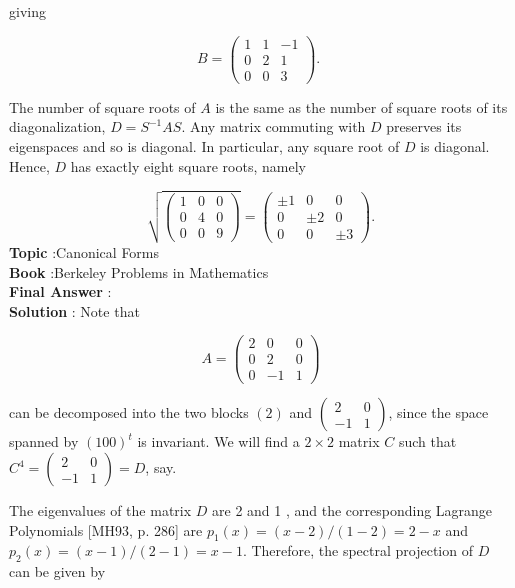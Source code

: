 \documentclass[10pt]{article}
\begin{document}
giving

$$
B=\left(\begin{array}{ccc}
1 & 1 & -1 \\
0 & 2 & 1 \\
0 & 0 & 3
\end{array}\right) \text {. }
$$

The number of square roots of $A$ is the same as the number of square roots of its diagonalization, $D=S^{-1} A S$. Any matrix commuting with $D$ preserves its eigenspaces and so is diagonal. In particular, any square root of $D$ is diagonal. Hence, $D$ has exactly eight square roots, namely

$$
\sqrt{\left(\begin{array}{lll}
1 & 0 & 0 \\
0 & 4 & 0 \\
0 & 0 & 9
\end{array}\right)}=\left(\begin{array}{ccc}
\pm 1 & 0 & 0 \\
0 & \pm 2 & 0 \\
0 & 0 & \pm 3
\end{array}\right) .
$$
\textbf{Topic} :Canonical Forms \\
\textbf{Book} :Berkeley Problems in Mathematics\\
\textbf{Final Answer} :\\


\textbf{Solution} : Note that

$$
A=\left(\begin{array}{ccc}
2 & 0 & 0 \\
0 & 2 & 0 \\
0 & -1 & 1
\end{array}\right)
$$

can be decomposed into the two blocks $(2)$ and $\left(\begin{array}{cc}2 & 0 \\ -1 & 1\end{array}\right)$, since the space spanned by $(100)^{t}$ is invariant. We will find a $2 \times 2$ matrix $C$ such that $C^{4}=\left(\begin{array}{cc}2 & 0 \\ -1 & 1\end{array}\right)=D$, say.

The eigenvalues of the matrix $D$ are 2 and 1 , and the corresponding Lagrange Polynomials [MH93, p. 286] are $p_{1}(x)=(x-2) /(1-2)=2-x$ and $p_{2}(x)=(x-1) /(2-1)=x-1$. Therefore, the spectral projection of $D$ can be given by
\end{document}
